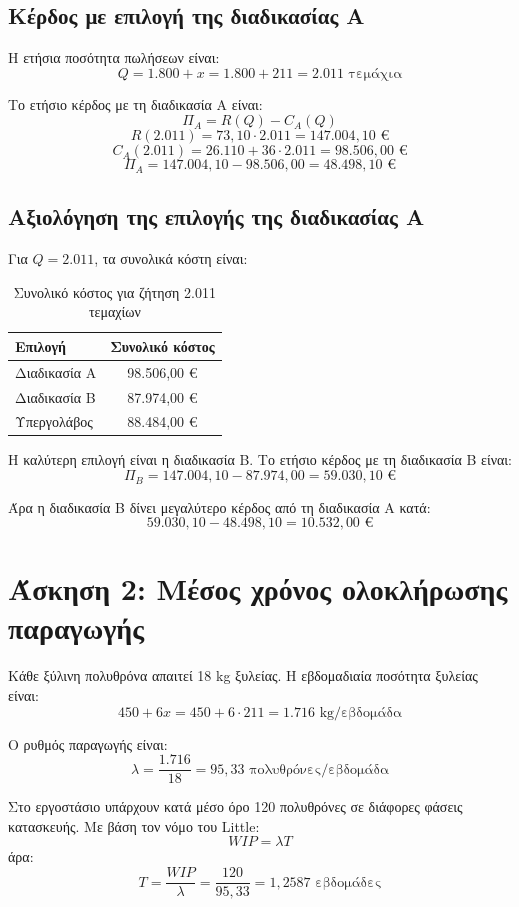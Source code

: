 \documentclass[12pt,a4paper]{article}
\begin{document}
\subsection{Κέρδος με επιλογή της διαδικασίας Α}

Η ετήσια ποσότητα πωλήσεων είναι:
\[
Q=1.800+x=1.800+211=2.011 \text{ τεμάχια}
\]

Το ετήσιο κέρδος με τη διαδικασία Α είναι:
\[
\Pi_A=R(Q)-C_A(Q)
\]
\[
R(2.011)=73{,}10 \cdot 2.011=147.004{,}10 \text{ €}
\]
\[
C_A(2.011)=26.110+36 \cdot 2.011=98.506{,}00 \text{ €}
\]
\[
\Pi_A=147.004{,}10-98.506{,}00=48.498{,}10 \text{ €}
\]

\subsection{Αξιολόγηση της επιλογής της διαδικασίας Α}

Για \(Q=2.011\), τα συνολικά κόστη είναι:

\begin{table}[H]
\centering
\caption{Συνολικό κόστος για ζήτηση 2.011 τεμαχίων}
\begin{tabular}{lc}
\toprule
\textbf{Επιλογή} & \textbf{Συνολικό κόστος} \\
\midrule
Διαδικασία Α & 98.506,00 € \\
Διαδικασία Β & 87.974,00 € \\
Υπεργολάβος & 88.484,00 € \\
\bottomrule
\end{tabular}
\end{table}

Η καλύτερη επιλογή είναι η διαδικασία Β. Το ετήσιο κέρδος με τη διαδικασία Β είναι:
\[
\Pi_B=147.004{,}10-87.974{,}00=59.030{,}10 \text{ €}
\]

Άρα η διαδικασία Β δίνει μεγαλύτερο κέρδος από τη διαδικασία Α κατά:
\[
59.030{,}10-48.498{,}10=10.532{,}00 \text{ €}
\]

\section{Άσκηση 2: Μέσος χρόνος ολοκλήρωσης παραγωγής}

Κάθε ξύλινη πολυθρόνα απαιτεί 18 kg ξυλείας. Η εβδομαδιαία ποσότητα ξυλείας είναι:
\[
450+6x=450+6 \cdot 211=1.716 \text{ kg/εβδομάδα}
\]

Ο ρυθμός παραγωγής είναι:
\[
\lambda=\frac{1.716}{18}=95{,}33 \text{ πολυθρόνες/εβδομάδα}
\]

Στο εργοστάσιο υπάρχουν κατά μέσο όρο 120 πολυθρόνες σε διάφορες φάσεις κατασκευής. Με βάση τον νόμο του Little:
\[
WIP=\lambda T
\]
άρα:
\[
T=\frac{WIP}{\lambda}=\frac{120}{95{,}33}=1{,}2587 \text{ εβδομάδες}
\]
\end{document}
